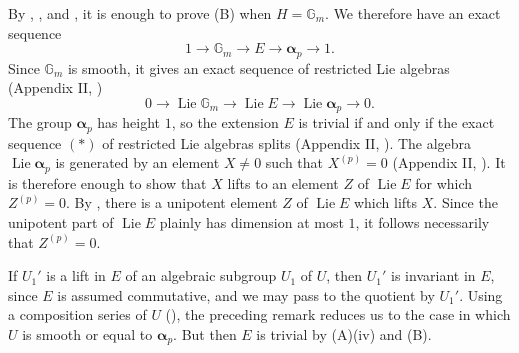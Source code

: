 
By , , and , it is enough to prove (B) when
\(H=\mathbb G_m\).  We therefore have an exact sequence
\[
  1\longrightarrow\mathbb G_m\longrightarrow E
    \longrightarrow\boldsymbol\alpha_p\longrightarrow1.
\]
Since \(\mathbb G_m\) is smooth, it gives an exact sequence of
restricted Lie algebras (Appendix II, )
\begin{equation}
  0\longrightarrow\operatorname{Lie}\mathbb G_m
    \longrightarrow\operatorname{Lie}E
    \longrightarrow\operatorname{Lie}\boldsymbol\alpha_p
    \longrightarrow0.
  \tag{*}\label{sga3:xvii:subsection:6-3:equation:star}
\end{equation}
The group \(\boldsymbol\alpha_p\) has height \(1\), so the
extension \(E\) is trivial if and only if the exact sequence
\((*)\) of restricted Lie algebras splits (Appendix II, ).
The algebra \(\operatorname{Lie}\boldsymbol\alpha_p\) is
generated by an element \(X\ne0\) such that \(X^{(p)}=0\)
(Appendix II, ).  It is therefore enough to show that \(X\)
lifts to an element \(Z\) of \(\operatorname{Lie}E\) for which
\(Z^{(p)}=0\).  By , there is a unipotent element \(Z\)
of \(\operatorname{Lie}E\) which lifts \(X\).  Since the unipotent
part of \(\operatorname{Lie}E\) plainly has dimension at most
\(1\), it follows necessarily that \(Z^{(p)}=0\).


If \(U_1'\) is a lift in \(E\) of an algebraic subgroup \(U_1\)
of \(U\), then \(U_1'\) is invariant in \(E\), since \(E\) is
assumed commutative, and we may pass to the quotient by \(U_1'\).
Using a composition series of \(U\) (), the preceding
remark reduces us to the case in which \(U\) is smooth or equal
to \(\boldsymbol\alpha_p\).  But then \(E\) is trivial by
(A)(iv) and (B).


